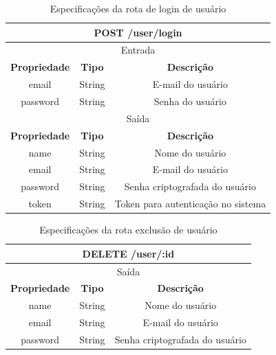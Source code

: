 \begin{table}[H]
    \centering
    \caption{Especificações da rota de login de usuário}
    \begin{tabular}{c|c|c}
    \hline
    \multicolumn{3}{c}{\textbf{POST /user/login}} \\ \hline
    \multicolumn{3}{c}{Entrada}                                                        \\ \hline
    \textbf{Propriedade}         & \textbf{Tipo}         & \textbf{Descrição}            \\  \hline
    email                        & String                & E-mail do usuário \\
    \hline
    password                     & String                & Senha do usuário \\

    \hline

    \multicolumn{3}{c}{Saída}                                                        \\ \hline
    \textbf{Propriedade}         & \textbf{Tipo}         & \textbf{Descrição}            \\  \hline
    name                         & String                & Nome do usuário               \\  \hline
    email                        & String                & E-mail do usuário \\
    \hline
    password                     & String                & Senha criptografada do usuário \\
    \hline
    token                     & String                & Token para autenticação no sistema \\
    \hline
    \end{tabular}
\end{table}

\begin{table}[H]
    \centering
    \caption{Especificações da rota exclusão de usuário}
    \begin{tabular}{c|c|c}
    \hline
    \multicolumn{3}{c}{\textbf{DELETE /user/:id}} \\ \hline
    \multicolumn{3}{c}{Saída}                                                          \\ \hline
    \textbf{Propriedade}         & \textbf{Tipo}         & \textbf{Descrição}            \\  \hline
    name                         & String                & Nome do usuário               \\  \hline
    email                        & String                & E-mail do usuário \\
    \hline
    password                     & String                & Senha criptografada do usuário \\
    \hline
    \end{tabular}
\end{table}

